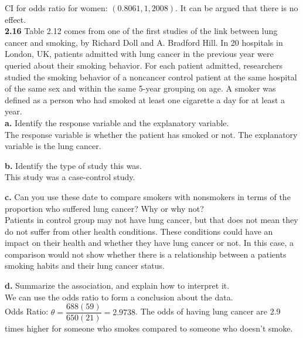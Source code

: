\documentclass[paper=letter, fontsize=11pt]{scrartcl} %
\begin{document}
CI for odds ratio for women: $(0.8061, 1,2008)$.
It can be argued that there is no effect.
\\

\textbf{2.16} Table 2.12 comes from one of the first studies of the link between lung cancer
and smoking, by Richard Doll and A. Bradford Hill. In 20 hospitals in London,
UK, patients admitted with lung cancer in the previous year were queried
about their smoking behavior. For each patient admitted, researchers studied
the smoking behavior of a noncancer control patient at the same hospital of the same sex
and within the same 5-year grouping on age. A smoker was defined as a person who had smoked 
at least one cigarette a day for at least a year. \\

\textbf{a.} Identify the response variable and the explanatory variable. \\

The response variable is whether the patient has smoked or not. The explanatory
variable is the lung cancer.

\textbf{b.} Identify the type of study this was. \\

This study was a case-control study.

\textbf{c.} Can you use these date to compare smokers with nonsmokers in terms of the proportion
who suffered lung cancer? Why or why not? \\
 
Patients in control group may not have lung cancer, but that does not mean they do not suffer from
other health conditions. These conditions could have an impact on their health and whether they have 
lung cancer or not. In this case, a comparison would not show whether there is a relationship between
a patients smoking habits and their lung cancer status.
 
 
\textbf{d.} Summarize the association, and explain how to interpret it. \\

We can use the odds ratio to form a conclusion about the data. \\
Odds Ratio: $\theta = \dfrac{688(59)}{650(21)} = 2.9738$. The odds of having lung cancer are 2.9 times higher
for someone who smokes compared to someone who doesn't smoke.
\end{document}
